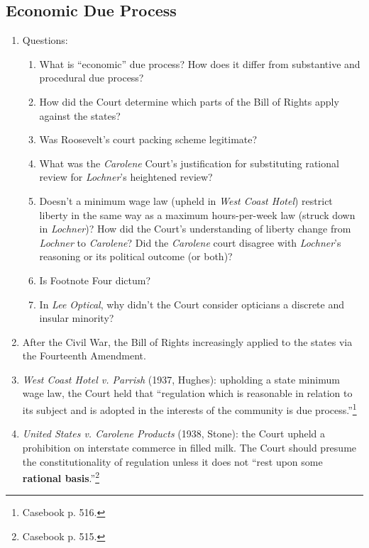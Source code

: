 \subsection{Economic Due Process}

\begin{enumerate}
    \item Questions:
    \begin{enumerate}
        \item What is ``economic'' due process? How does it differ from 
        substantive and procedural due process? %
        \item How did the Court determine which parts of the Bill of Rights apply 
        against the states?
        \item Was Roosevelt's court packing scheme legitimate?
        \item What was the \emph{Carolene} Court's justification for substituting 
        rational review for \emph{Lochner}'s heightened review?
        \item Doesn't a minimum wage law (upheld in \emph{West Coast Hotel}) 
        restrict liberty in the same way as a maximum hours-per-week law (struck 
        down in \emph{Lochner})? How did the Court's understanding of liberty 
        change from \emph{Lochner} to \emph{Carolene}? Did the \emph{Carolene} 
        court disagree with \emph{Lochner}'s reasoning or its political 
        outcome (or both)?
        \item Is Footnote Four dictum?
        \item In \emph{Lee Optical}, why didn't the Court consider opticians a 
        discrete and insular minority?
    \end{enumerate}
    \item After the Civil War, the Bill of Rights increasingly applied to the 
    states via the Fourteenth Amendment.
    \item \emph{West Coast Hotel v. Parrish} (1937, Hughes): upholding a state 
    minimum wage law, the Court held that ``regulation which is reasonable in 
    relation to its subject and is adopted in the interests of the community 
    is due process.''\footnote{Casebook p. 516.}
    \item \emph{United States v. Carolene Products} (1938, Stone): the Court 
    upheld a prohibition on interstate commerce in filled milk. The Court 
    should presume the constitutionality of regulation unless it does not 
    ``rest upon some \textbf{rational basis}.''\footnote{Casebook p. 515.} 

\end{enumerate}

